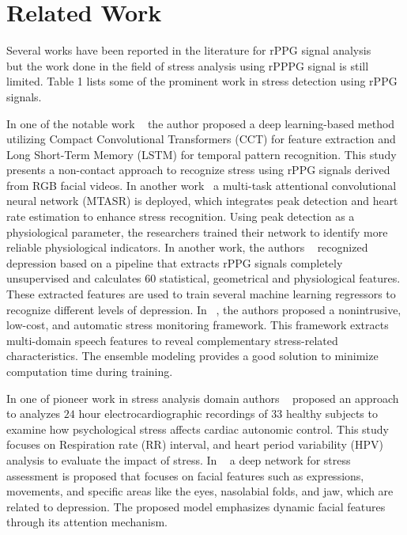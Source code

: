 \section{Related Work}

Several works have been reported in the literature for rPPG signal analysis ~\cite{10155145}~\cite{speth2024mspm}~\cite{mcduff2023camera}  but the work done in the field of stress analysis using rPPPG signal is still limited. Table 1 lists some of the prominent work in stress detection using rPPG signals.


In one of the notable work ~\cite{ziaratnia2024multimodal} the author proposed a deep learning-based method utilizing Compact Convolutional Transformers (CCT) for feature extraction and Long Short-Term Memory (LSTM) for temporal pattern recognition. This study presents a non-contact approach to recognize stress using rPPG signals derived from RGB facial videos. In another work~\cite{xu2024facial}  a multi-task attentional convolutional neural network (MTASR) is deployed, which integrates peak detection and heart rate estimation to enhance stress recognition. Using peak detection as a physiological parameter, the researchers trained their network to identify more reliable physiological indicators. In another work, the authors
~\cite{casado2023depression} recognized depression based on a pipeline that extracts rPPG signals completely unsupervised and calculates $60$ statistical, geometrical and physiological features. These extracted features are used to train several machine learning regressors to recognize different levels of depression. In ~\cite{ntalampiras2023model}, the authors proposed a nonintrusive, low-cost, and automatic stress monitoring framework. This framework extracts multi-domain speech features to reveal complementary stress-related characteristics. The ensemble modeling provides a good solution to minimize computation time during  training.

In one of pioneer work in stress analysis domain
 authors  ~\cite{sloan1994effect}  proposed  an approach to analyzes $24$ hour electrocardiographic recordings of $33$ healthy subjects to examine how psychological stress affects cardiac autonomic control. This study focuses on Respiration rate (RR) interval, and heart period variability (HPV) analysis to evaluate the impact of stress.
In ~\cite{pan2024spatial} a deep  network for stress assessment  is proposed that focuses on facial features such as expressions, movements, and specific areas like the eyes, nasolabial folds, and jaw, which are related to depression. The proposed model emphasizes dynamic facial features through its attention mechanism.


